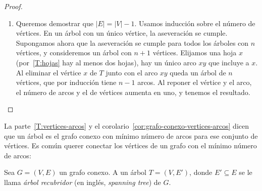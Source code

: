 \begin{proof}
\begin{enumerate}[label=\textbf{T\arabic{*}:},
		      ref=T\arabic{*},
		      start=3]
      Nótese que el caso extremo de dos hojas se da en un camino.
    \item
      Queremos demostrar
      que \(\lvert E \rvert = \lvert V \rvert - 1\).
      Usamos inducción sobre el número de vértices.%
      En un árbol con un único vértice,
      la aseveración se cumple.
      Supongamos ahora que la aseveración se cumple
      para todos los árboles con \(n\) vértices,
      y consideremos un árbol con \(n + 1\) vértices.
      Elijamos una hoja \(x\)
      (por~\ref{T:hojas} hay al menos dos hojas),
      hay un único arco \(x y\) que incluye a \(x\).
      Al eliminar el vértice \(x\) de \(T\)
      junto con el arco \(x y\)
      queda un árbol de \(n\) vértices,
      que por inducción tiene \(n - 1\) arcos.
      Al reponer el vértice y el arco,
      el número de arcos y el de vértices aumenta en uno,
      y tenemos el resultado.
    \qedhere
    \end{enumerate}
  \end{proof}
  La parte~\ref{T:vertices-arcos}
  y el corolario~\ref{cor:grafo-conexo-vertices-arcos}
  dicen que un árbol es el grafo conexo con mínimo número de arcos%
  para ese conjunto de vértices.
  Es común querer conectar los vértices de un grafo
  con el mínimo número de arcos:
  \begin{definition}
    Sea \(G = (V, E)\) un grafo conexo.
    A un árbol \(T = (V, E')\),
    donde \(E' \subseteq E\)
    se le llama \emph{árbol recubridor}
    (en inglés, \emph{\foreignlanguage{english}{spanning tree}})
    de \(G\).
  \end{definition}

